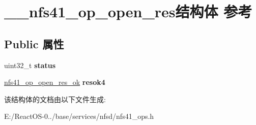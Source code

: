 \hypertarget{struct____nfs41__op__open__res}{}\section{\+\_\+\+\_\+nfs41\+\_\+op\+\_\+open\+\_\+res结构体 参考}
\label{struct____nfs41__op__open__res}
\subsection*{Public 属性}
\begin{DoxyCompactItemize}
\item 
\mbox{\label{struct____nfs41__op__open__res_a3cc40114d59b85f69d77789cf8d701b0}} 
uint32\+\_\+t {\bfseries status}
\item 
\mbox{\label{struct____nfs41__op__open__res_ac626202424932d095acc17168d024ba6}} 
\hyperlink{struct____nfs41__op__open__res__ok}{nfs41\+\_\+op\+\_\+open\+\_\+res\+\_\+ok} {\bfseries resok4}
\end{DoxyCompactItemize}


该结构体的文档由以下文件生成\+:\begin{DoxyCompactItemize}
\item 
E\+:/\+React\+O\+S-\/0../base/services/nfsd/nfs41\+\_\+ops.\+h\end{DoxyCompactItemize}
